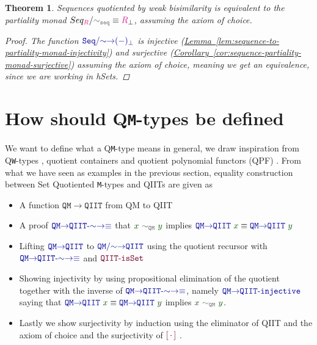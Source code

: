 \documentclass[twoside,11pt,openright]{report}
\theoremstyle{plain} %
\newtheorem{thm}{Theorem}[section]
\theoremstyle{definition}
\theoremstyle{remark}
\newcommand*{\lemref}[1]{\hyperref[lem:#1]{Lemma~\ref*{lem:#1}}}
\newcommand*{\corref}[1]{\hyperref[cor:#1]{Corollary~\ref*{cor:#1}}}
\newcommand*{\term}[1]{\textcolor{green!30!black}{#1}} %
\newcommand*{\type}[1]{\textcolor{magenta!90!black}{#1}}
\newcommand*{\relation}[1]{\textcolor{gray!75!black}{\ensuremath{\mathtt{#1}}}}
\newcommand*{\function}[1]{\textcolor{blue!60!black}{\ensuremath{\mathtt{#1}}}}
\newcommand*{\constructor}[1]{\textcolor{purple!60!black}{\ensuremath{\mathtt{#1}}}}
\newcommand*{\quotientconstructor}[1]{\constructor{[}\,#1\,\constructor{]}}
\begin{document}
\begin{thm}
  \label{thm:sequence-partiality-monad-eq}
  Sequences quotiented by weak bisimilarity is equivalent to the partiality monad \(Seq_{\type{R}} / \relation{\sim_{seq}} \equiv \type{R}_{\bot}\), assuming the axiom of choice.
  \begin{proof}
 The function \(\function{Seq/{\sim}{\rightarrow}(-)_\bot}\) is injective (\lemref{sequence-to-partiality-monad-injectivity}) and surjective (\corref{sequence-partiality-monad-surjective}) assuming the axiom of choice, meaning we get an equivalence, since we are working in hSets.
\end{proof}
\end{thm}

\section{How should Q\texttt{M}-types be defined}
We want to define what a Q\texttt{M}-type means in general, we draw inspiration from Q\texttt{W}-types \cite{DBLP:Constructing-QIITs}, quotient containers \cite{DBLP:quotient-container} and quotient polynomial functors (QPF) \cite{DBLP:QM-lean}. From what we have seen as examples in the previous section, equality construction between Set Quotiented \texttt{M}-types and QIITs are given as
\begin{itemize}
\item A function \function{QM{\rightarrow}QIIT} from QM to QIIT
\item A proof \(\function{QM{\rightarrow}QIIT\text{-}{\sim}{\rightarrow}{\equiv}}\) that \(\term{x}~\relation{\sim_{QM}}~\term{y}\) implies \(\function{QM{\rightarrow}QIIT}~\term{x} \equiv \function{QM{\rightarrow}QIIT}~\term{y}\)
\item Lifting \(\function{QM{\rightarrow}QIIT}\) to \(\function{QM/{\sim}{\rightarrow}QIIT}\) using the quotient recursor with \(\function{QM{\rightarrow}QIIT\text{-}{\sim}{\rightarrow}{\equiv}}\) and \(\constructor{QIIT\text{-}isSet}\)
\item Showing injectivity by using propositional elimination of the quotient together with the inverse of \(\function{QM{\rightarrow}QIIT\text{-}{\sim}{\rightarrow}{\equiv}}\), namely \(\function{QM{\rightarrow}QIIT\text{-}injective}\) saying that \(\function{QM{\rightarrow}QIIT}~\term{x} \equiv \function{QM{\rightarrow}QIIT}~\term{y}\) implies \(\term{x}~\relation{\sim_{QM}}~\term{y}\).
\item Lastly we show surjectivity by induction using the eliminator of QIIT and the axiom of choice and the surjectivity of \(\quotientconstructor{{\cdot}}\) \cite[6.10.2]{hottbook}.
\end{itemize}
\end{document}
